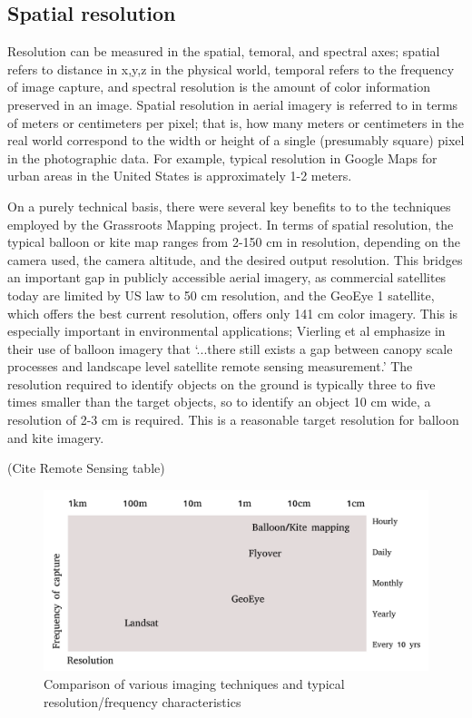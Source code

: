 \documentclass[11pt,oneside,notitlepage]{report}
\begin{document}
\subsection{Spatial resolution}

Resolution can be measured in the spatial, temoral, and spectral axes; spatial refers to distance in x,y,z in the physical world, temporal refers to the frequency of image capture, and spectral resolution is the amount of color information preserved in an image. Spatial resolution in aerial imagery is referred to in terms of meters or centimeters per pixel; that is, how many meters or centimeters in the real world correspond to the width or height of a single (presumably square) pixel in the photographic data. For example, typical resolution in Google Maps for urban areas in the United States is approximately 1-2 meters. 
 
On a purely technical basis, there were several key benefits to to the techniques employed by the Grassroots Mapping project. In terms of spatial resolution, the typical balloon or kite map ranges from 2-150 cm in resolution, depending on the camera used, the camera altitude, and the desired output resolution. This bridges an important gap in publicly accessible aerial imagery, as commercial satellites today are limited by US law to 50 cm resolution, and the GeoEye 1 satellite, which offers the best current resolution, offers only 141 cm color imagery. This is especially important in environmental applications; Vierling et al emphasize in their use of balloon imagery that `...there still exists a gap between canopy scale processes and landscape level satellite remote sensing measurement.' \cite{vierling2006short} The resolution required to identify objects on the ground is typically three to five times smaller than the target objects, so to identify an object 10 cm wide, a resolution of 2-3 cm is required. \cite{aber2002unmanned} This is a reasonable target resolution for balloon and kite imagery. 

(Cite Remote Sensing table)


\begin{figure}[h]
  \begin{center}
	\includegraphics[width=1\textwidth]{diagrams/resolution-frequency.pdf}
	\caption{Comparison of various imaging techniques and typical resolution/frequency characteristics}
  \end{center}
\end{figure}
\end{document}
